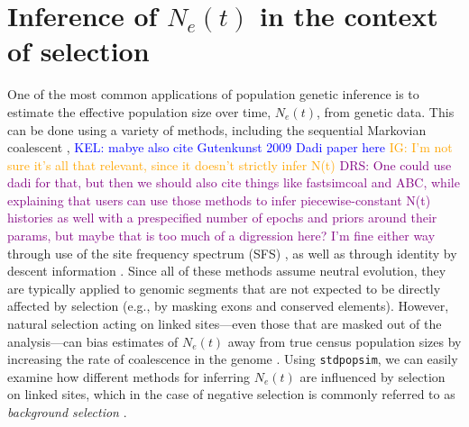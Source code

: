 \documentclass[hidelinks]{article}
\newcommand{\stdpopsim}{\texttt{stdpopsim}\xspace}
\newcommand{\kelcomment}[1]{\textcolor{blue}{KEL: #1}}
\newcommand{\drscomment}[1]{\textcolor{purple}{DRS: #1}}
\newcommand{\igcomment}[1]{\textcolor{orange}{IG: #1}}
\begin{document}

    \section*{Inference of $N_e(t)$ in the context of selection}
    One of the most common applications of population genetic inference is to estimate
    the effective population size over time, $N_e(t)$, from genetic data. This can be done
    using a variety of methods, including the sequential Markovian coalescent
    \citep{li2011inference,Schiffels2020,terhorst2017robust}, \kelcomment{mabye also cite Gutenkunst 2009 Dadi paper here} 
    \igcomment{I'm not sure it's all that relevant, since it doesn't strictly infer N(t)}
    \drscomment{One could use dadi for that, but then we should also cite things like fastsimcoal and ABC, while explaining
    that users can use those methods to infer piecewise-constant N(t) histories as well with a prespecified number of epochs
    and priors around their params, but maybe that is too much of a digression here? I'm fine either way}
    through use of the site frequency spectrum (SFS) \citep{liu2020stairway},
    as well as through identity by descent information \citep{santiago2020recent}.
    Since all of these methods assume neutral evolution, they are typically applied to genomic
    segments that are not expected to be directly affected by selection (e.g., by masking exons
    and conserved elements).
    However, natural selection acting on linked sites---even those that are masked out of the
    analysis---can bias estimates of $N_e(t)$
    away from true census population sizes by increasing the 
    rate of coalescence in the genome \citep[e.g.][]{schrider2016effects}. 
    Using \stdpopsim, we can easily examine how different methods for inferring $N_e(t)$
    are influenced by selection on linked sites,
    which in the case of negative selection is commonly referred to as \emph{background selection}
    \citep{charlesworth1993effect,hudson1995deleterious}.
\end{document}
